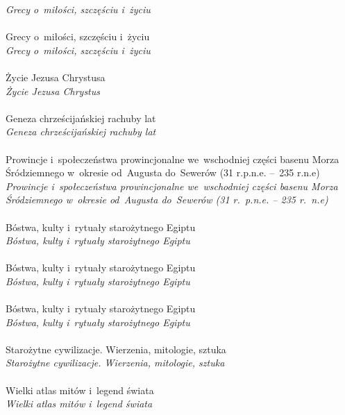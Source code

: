 \documentclass[a4paper,11pt]{article}
\numberwithin{equation}{section}
\begin{document}
\PowinnoByc \textit{Grecy o~miłości, szczęściu i~życiu} \\
 \\
\Jest  Grecy o~miłości, szczęściu i~życiu \\
\PowinnoByc \textit{Grecy o~miłości, szczęściu i~życiu} \\
 \\
\Jest Życie Jezusa Chrystusa \\
\PowinnoByc \textit{Życie Jezusa Chrystus} \\
 \\
\Jest Geneza chrześcijańskiej rachuby lat \\
\PowinnoByc \textit{Geneza chrześcijańskiej rachuby lat} \\
 \\
\Jest Prowincje i~społeczeństwa prowincjonalne we~wschodniej części
basenu Morza Śródziemnego w~okresie od~Augusta do~Sewerów
(31 r.p.n.e. --~235 r.n.e) \\
\PowinnoByc \textit{Prowincje i~społeczeństwa prowincjonalne we~wschodniej
  części basenu Morza Śródziemnego w~okresie od~Augusta do~Sewerów
  (31 r.~p.n.e. -- 235 r.~n.e)} \\
 \\
\Jest Bóstwa, kulty i~rytuały starożytnego Egiptu \\
\PowinnoByc \textit{Bóstwa, kulty i~rytuały starożytnego Egiptu} \\
 \\
\Jest Bóstwa, kulty i~rytuały starożytnego Egiptu \\
\PowinnoByc \textit{Bóstwa, kulty i~rytuały starożytnego Egiptu} \\
 \\
\Jest Bóstwa, kulty i~rytuały starożytnego Egiptu \\
\PowinnoByc \textit{Bóstwa, kulty i~rytuały starożytnego Egiptu} \\
 \\
\Jest Starożytne cywilizacje. Wierzenia, mitologie, sztuka \\
\PowinnoByc \textit{Starożytne cywilizacje. Wierzenia, mitologie, sztuka} \\
 \\
\Jest Wielki atlas mitów i~legend świata \\
\PowinnoByc \textit{Wielki atlas mitów i~legend świata} \\
\end{document}
